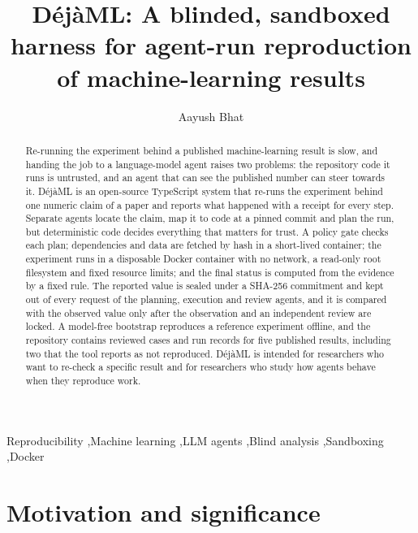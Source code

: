 \documentclass[preprint,12pt]{elsarticle}
\newcommand{\dejaml}{D\'ej\`aML}
\begin{document}
\begin{frontmatter}

\title{\dejaml{}: A blinded, sandboxed harness for agent-run reproduction of machine-learning results}

\author{Aayush Bhat}

\begin{abstract}
Re-running the experiment behind a published machine-learning result is slow,
and handing the job to a language-model agent raises two problems: the
repository code it runs is untrusted, and an agent that can see the published
number can steer towards it. \dejaml{} is an open-source TypeScript system that
re-runs the experiment behind one numeric claim of a paper and reports what
happened with a receipt for every step. Separate agents locate the claim, map
it to code at a pinned commit and plan the run, but deterministic code decides
everything that matters for trust. A policy gate checks each plan; dependencies
and data are fetched by hash in a short-lived container; the experiment runs in
a disposable Docker container with no network, a read-only root filesystem and
fixed resource limits; and the final status is computed from the evidence by a
fixed rule. The reported value is sealed under a SHA-256 commitment and kept out of every
request of the planning, execution and review agents, and it is compared with
the observed value only after the observation and an independent review are
locked. A model-free bootstrap reproduces a reference experiment offline,
and the repository contains reviewed cases and run records for five published
results, including two that the tool reports as not reproduced. \dejaml{} is intended for researchers who want to re-check a specific
result and for researchers who study how agents behave when they reproduce
work.
\end{abstract}

\begin{keyword}
Reproducibility \sep Machine learning \sep LLM agents \sep Blind analysis \sep Sandboxing \sep Docker
\end{keyword}

\end{frontmatter}

\section{Motivation and significance}
\label{sec:motivation}
\end{document}
